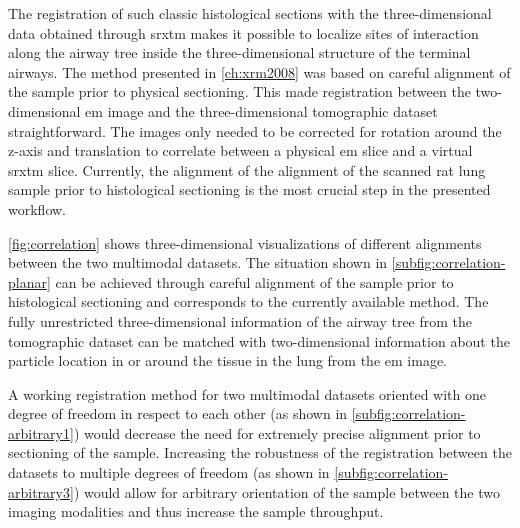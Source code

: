 The registration of such classic histological sections with the three-di\-men\-sion\-al data obtained through \ac{srxtm} makes it possible to localize sites of interaction along the airway tree inside the three-dimensional structure of the terminal airways. The method presented in \autoref{ch:xrm2008} was based on careful alignment of the sample prior to physical sectioning. This made registration between the two-dimensional \ac{em} image and the three-dimensional tomographic dataset straightforward. The images only needed to be corrected for rotation around the z-axis and translation to correlate between a physical \ac{em} slice and a virtual \ac{srxtm} slice. Currently, the alignment of the alignment of the scanned rat lung sample prior to histological sectioning is the most crucial step in the presented workflow.

\autoref{fig:correlation} shows three-dimensional visualizations of different alignments between the two multimodal datasets. The situation shown in \autoref{subfig:correlation-planar} can be achieved through careful alignment of the sample prior to histological sectioning and corresponds to the currently available method. The fully unrestricted three-dimensional information of the airway tree from the tomographic dataset can be matched with two-dimensional information about the particle location in or around the tissue in the lung from the \ac{em} image.

A working registration method for two multimodal datasets oriented with one degree of freedom in respect to each other (as shown in \autoref{subfig:correlation-arbitrary1}) would decrease the need for extremely precise alignment prior to sectioning of the sample. Increasing the robustness of the registration between the datasets to multiple degrees of freedom (as shown in \autoref{subfig:correlation-arbitrary3}) would allow for arbitrary orientation of the sample between the two imaging modalities and thus increase the sample throughput.

